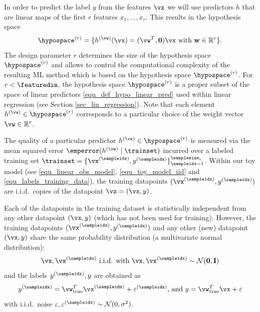 \documentclass[12pt]{report}
\begin{document}
In order to predict the label $y$ from the features $\vx$ we will use 
predictors $h$ that are linear maps of the first $r$ features $x_{1},\ldots,x_{r}$. 
This results in the hypothesis space 
\vspace*{-2mm}
\begin{equation}
\label{equ_generalization_hypospace_r}
\hypospace^{(r)} = \{ h^{(\vw)}(\vx)= (\vw^{T},\mathbf{0}) \vx \mbox{ with } \mathbf{w} \in \mathbb{R}^{r} \}.   
\vspace*{-1mm}
\end{equation}
The design parameter $r$ determines the size of the hypothesis space 
$\hypospace^{(r)}$ and allows to control the computational complexity 
of the resulting ML method which is based on the hypothesis space 
$\hypospace^{(r)}$. For $r < \featuredim$, the hypothesis space $\hypospace^{(r)}$ 
is a proper subset of the space of linear predictors \eqref{equ_def_hypo_linear_pred} 
used within linear regression (see Section \ref{sec_lin_regression}). Note that 
each element $h^{(\vw)} \in \hypospace^{(r)}$ corresponds to a particular 
choice of the weight vector $\vw \in \mathbb{R}^{r}$. 

The quality of a particular predictor $h^{(\vw)} \in \hypospace^{(r)}$ is measured 
via the mean squared error $\emperror (h^{(\vw)} \mid \trainset)$ incurred over a 
labeled training set $\trainset= \{ \vx^{(\sampleidx)}, y^{(\sampleidx)} \}_{\sampleidx=1}^{\samplesize_{\rm t}}$. 
Within our toy model (see \eqref{equ_linear_obs_model}, \eqref{equ_toy_model_iid} 
and \eqref{equ_labels_training_data}), the training datapoints $(\vx^{(\sampleidx)},y^{(\sampleidx)})$ 
are i.i.d.\ copies of the datapoint $\vz = (\vx,y)$. 

Each of the datapoints in the training dataset is statistically independent from 
any other datapoint $(\vx,y)$ (which has not been used for training). However, 
the training datapoints $(\vx^{(\sampleidx)},y^{(\sampleidx)})$ and any other (new) 
datapoint $(\vx,y)$ share the same probability distribution (a multivariate normal distribution): 
\begin{equation} 
\label{equ_toy_model_iid}
\vx, \vx^{(\sampleidx)} \mbox{ i.i.d. with } \vx, \vx^{(\sampleidx)} \sim \mathcal{N}(\mathbf{0}, \mathbf{I}) 
\end{equation} 
and the labels $y^{(\sampleidx)},y$ are obtained as 
\begin{equation} 
\label{equ_labels_training_data}
y^{(\sampleidx)} = \vw_{\rm true}^{T}  \vx^{(\sampleidx)} + \varepsilon^{(\sampleidx)}\mbox{, and } y = \vw_{\rm true}^{T}  \vx + \varepsilon
\end{equation}  
with i.i.d.\ noise $\varepsilon, \varepsilon^{(\sampleidx)} \sim \mathcal{N}(0,\sigma^{2})$. 
\end{document}
